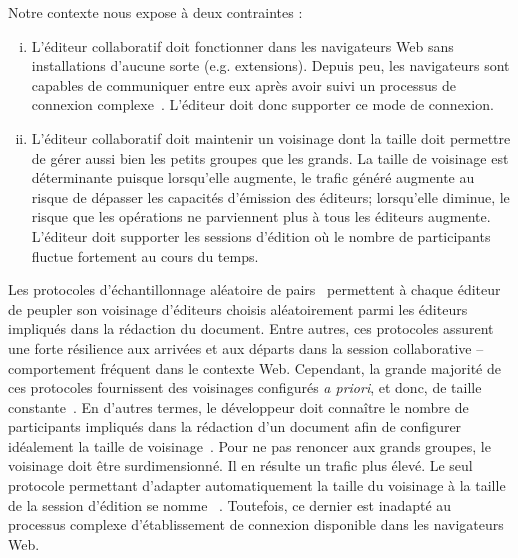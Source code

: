 \noindent Notre contexte nous expose à deux contraintes :

\begin{enumerate}[(i)]
\item L'éditeur collaboratif doit fonctionner dans les navigateurs Web sans
  installations d'aucune sorte (e.g. extensions). Depuis peu, les navigateurs
  sont capables de communiquer entre eux après avoir suivi un processus de
  connexion complexe~\cite{webrtc}. L'éditeur doit donc supporter ce mode de
  connexion.

\item L'éditeur collaboratif doit maintenir un voisinage dont la taille doit
  permettre de gérer aussi bien les petits groupes que les grands.  La taille de
  voisinage est déterminante puisque lorsqu'elle augmente, le trafic généré
  augmente au risque de dépasser les capacités d'émission des éditeurs;
  lorsqu'elle diminue,
  le risque que les opérations ne parviennent plus à tous les éditeurs augmente.
  L'éditeur doit supporter les sessions d'édition où le nombre de participants
  fluctue fortement au cours du temps.
\end{enumerate}

Les protocoles d'échantillonnage aléatoire de pairs~\cite{jelasity2007gossip}
permettent à chaque éditeur de peupler son voisinage d'éditeurs choisis
aléatoirement parmi les éditeurs impliqués dans la rédaction du document. Entre
autres, ces protocoles assurent une forte résilience aux arrivées et aux départs
dans la session collaborative -- comportement fréquent dans le contexte
Web. Cependant, la grande majorité de ces protocoles fournissent des voisinages
configurés \emph{a priori}, et donc, de taille
constante~\cite{eugster2003lightweight, jelasity2007gossip,
  leitao2007dependable, tolgyeski2009adaptive, voulgaris2005cyclon}. En d'autres
termes, le développeur doit connaître le nombre de participants impliqués dans
la rédaction d'un document afin de configurer idéalement la taille de
voisinage~\cite{erdos1959random}.  Pour ne pas renoncer aux grands groupes, le
voisinage doit être surdimensionné. Il en résulte un trafic plus élevé. Le seul
protocole permettant d'adapter automatiquement la taille du voisinage à la
taille de la session d'édition se nomme \SCAMP~\cite{ganesh2003peer}. Toutefois,
ce dernier est inadapté au processus complexe d'établissement de connexion
disponible dans les navigateurs Web.

